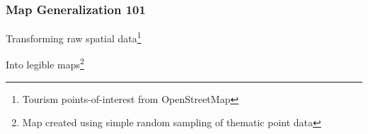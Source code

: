 \documentclass{beamer}
\begin{document}
\frame
{
  \frametitle{Map Generalization 101}
  Transforming raw spatial data\footnote{Tourism points-of-interest from OpenStreetMap}
  \begin{center}
  \end{center}
  Into legible maps\footnote{Map created using simple random sampling of thematic point data}
  \begin{center}
  \end{center}
}
\end{document}
